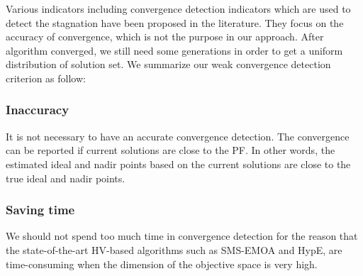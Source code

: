 \documentclass[conference]{IEEEtran}
\begin{document}
%
%
%
Various indicators including convergence detection indicators which are used to detect the stagnation 
have been proposed in the literature\cite{convergenceDetection:1, convergenceDetection:LSSC, 
convergenceDetection:OCD, convergenceDetection:OFCDandOCD, convergenceDetection:convergenceMetric, 
convergenceDetection:maxCD, convergenceDetection:online}. 
They focus on the accuracy of convergence, which is not the purpose in our approach.
After algorithm converged, we still need some generations in order to
get a uniform distribution of solution set. 
We summarize our weak convergence detection criterion as follow:
\subsubsection{Inaccuracy} It is not necessary to have an accurate convergence detection. 
The convergence can be reported if current solutions are close to the PF.
In other words, the estimated ideal and nadir points based on the current solutions
are close to the true ideal and nadir points. 
\subsubsection{Saving time} We should not spend too much time in convergence detection
for the reason that the state-of-the-art HV-based algorithms such as SMS-EMOA and HypE, 
are time-consuming when the dimension of the objective space is very high. 
\end{document}
